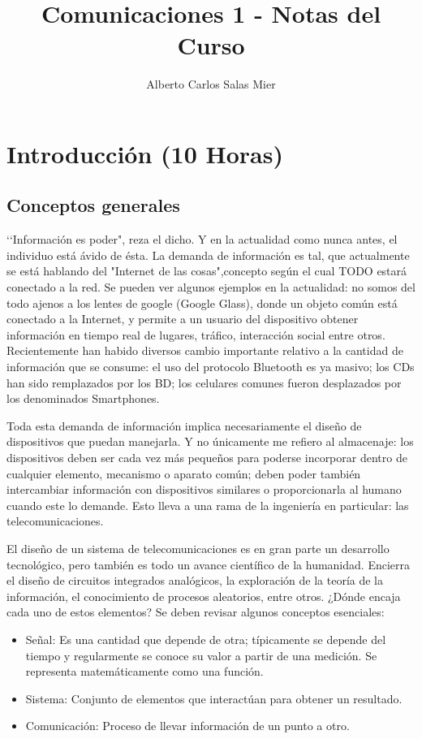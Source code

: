 \documentclass[12pt,letterpaper,titlepage,twoside]{book}
\author{Alberto Carlos Salas Mier}
\title{Comunicaciones 1 - Notas del Curso}
\begin{document}
\tableofcontents
\chapter{Introducción            (10 Horas)}
\section{Conceptos generales}

\lq \lq Información es poder", reza el dicho. Y en la actualidad como nunca antes, el individuo está ávido de ésta. La demanda de información es tal, que actualmente se está hablando del "Internet de las cosas",concepto según el cual TODO estará conectado a la red. Se pueden ver algunos ejemplos en la actualidad: no somos del todo ajenos a los lentes de google (Google Glass), donde un objeto común está conectado a la Internet, y permite a un usuario del dispositivo obtener información en tiempo real de lugares, tráfico, interacción social entre otros. Recientemente han habido diversos cambio importante relativo a la cantidad de información que se consume: el uso del protocolo Bluetooth es ya masivo; los CDs han sido remplazados por los BD; los celulares comunes fueron desplazados por los denominados Smartphones.
	
Toda esta demanda de información implica necesariamente el diseño de dispositivos que puedan manejarla. Y no únicamente me refiero al almacenaje: los dispositivos deben ser cada vez más pequeños para poderse incorporar dentro de cualquier elemento, mecanismo o aparato común; deben poder también intercambiar información con dispositivos similares o proporcionarla al humano cuando este lo demande. Esto lleva a una rama de la ingeniería en particular: las telecomunicaciones.

El diseño de un sistema de telecomunicaciones es en gran parte un desarrollo tecnológico, pero también es todo un avance científico de la humanidad. Encierra el diseño de circuitos integrados analógicos, la exploración de la teoría de la información, el conocimiento de procesos aleatorios, entre otros. ¿Dónde encaja cada uno de estos elementos? Se deben revisar algunos conceptos esenciales:
\begin{itemize}
\item Señal: Es una cantidad que depende de otra; típicamente se depende del tiempo y regularmente se conoce su valor a partir de una medición. Se representa matemáticamente como una función. 

\item Sistema: Conjunto de elementos que interactúan para obtener un resultado.
\item Comunicación: Proceso de llevar información de un punto a otro.
\end{itemize} 
\end{document}
